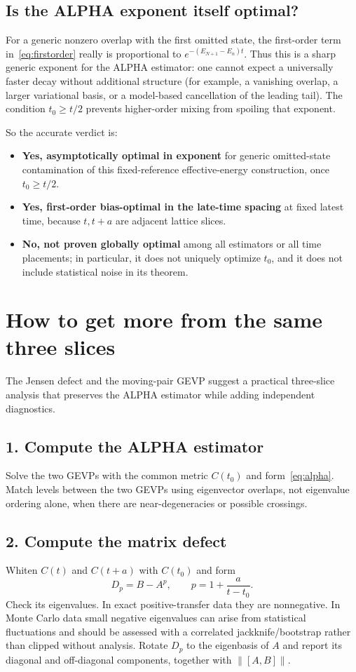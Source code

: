 \documentclass[11pt]{article}
\begin{document}
\subsection{Is the ALPHA exponent itself optimal?}
For a generic nonzero overlap with the first omitted state, the first-order term in~\eqref{eq:firstorder} really is proportional to $e^{-(E_{N+1}-E_n)t}$. Thus this is a sharp generic exponent for the ALPHA estimator: one cannot expect a universally faster decay without additional structure (for example, a vanishing overlap, a larger variational basis, or a model-based cancellation of the leading tail). The condition $t_0\geq t/2$ prevents higher-order mixing from spoiling that exponent.

So the accurate verdict is:
\begin{itemize}
\item \textbf{Yes, asymptotically optimal in exponent} for generic omitted-state contamination of this fixed-reference effective-energy construction, once $t_0\geq t/2$.
\item \textbf{Yes, first-order bias-optimal in the late-time spacing} at fixed latest time, because $t,t+a$ are adjacent lattice slices.
\item \textbf{No, not proven globally optimal} among all estimators or all time placements; in particular, it does not uniquely optimize $t_0$, and it does not include statistical noise in its theorem.
\end{itemize}

\section{How to get more from the same three slices}
The Jensen defect and the moving-pair GEVP suggest a practical three-slice analysis that preserves the ALPHA estimator while adding independent diagnostics.

\subsection{1. Compute the ALPHA estimator}
Solve the two GEVPs with the common metric $C(t_0)$ and form~\eqref{eq:alpha}. Match levels between the two GEVPs using eigenvector overlaps, not eigenvalue ordering alone, when there are near-degeneracies or possible crossings.

\subsection{2. Compute the matrix defect}
Whiten $C(t)$ and $C(t+a)$ with $C(t_0)$ and form
\[
D_p=B-A^p,\qquad p=1+\frac{a}{t-t_0}.
\]
Check its eigenvalues. In exact positive-transfer data they are nonnegative. In Monte Carlo data small negative eigenvalues can arise from statistical fluctuations and should be assessed with a correlated jackknife/bootstrap rather than clipped without analysis. Rotate $D_p$ to the eigenbasis of $A$ and report its diagonal and off-diagonal components, together with $\|[A,B]\|$.
\end{document}
